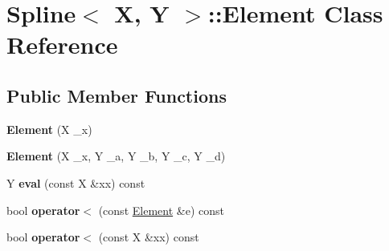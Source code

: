 \hypertarget{classSpline_1_1Element}{\section{Spline$<$ X, Y $>$\-:\-:Element Class Reference}
\label{classSpline_1_1Element}
}
\subsection*{Public Member Functions}
\begin{DoxyCompactItemize}
\item 
\hypertarget{classSpline_1_1Element_a695c4dd8fdc435c30a6f57af535940ee}{{\bfseries Element} (X \-\_\-x)}\label{classSpline_1_1Element_a695c4dd8fdc435c30a6f57af535940ee}

\item 
\hypertarget{classSpline_1_1Element_a7e96953dd79b35946450917573853999}{{\bfseries Element} (X \-\_\-x, Y \-\_\-a, Y \-\_\-b, Y \-\_\-c, Y \-\_\-d)}\label{classSpline_1_1Element_a7e96953dd79b35946450917573853999}

\item 
\hypertarget{classSpline_1_1Element_a7311d21fcf5c5ddf6650d50a3068d2d4}{Y {\bfseries eval} (const X \&xx) const }\label{classSpline_1_1Element_a7311d21fcf5c5ddf6650d50a3068d2d4}

\item 
\hypertarget{classSpline_1_1Element_a8852e43590a6a049a8ea1d2d4bf5a815}{bool {\bfseries operator$<$} (const \hyperlink{classSpline_1_1Element}{Element} \&e) const }\label{classSpline_1_1Element_a8852e43590a6a049a8ea1d2d4bf5a815}

\item 
\hypertarget{classSpline_1_1Element_af6975df6a1a988f2b154758097f334d4}{bool {\bfseries operator$<$} (const X \&xx) const }\label{classSpline_1_1Element_af6975df6a1a988f2b154758097f334d4}

\end{DoxyCompactItemize}
